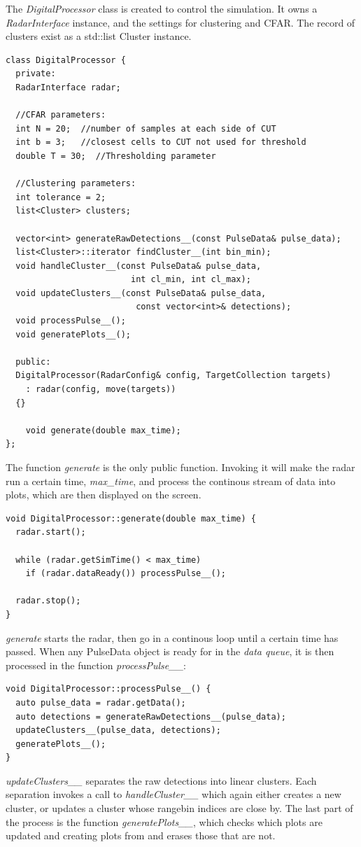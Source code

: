 \documentclass[letterpaper]{book}
\begin{document}
The \textit{DigitalProcessor} class is created to control the simulation. It owns a \textit{RadarInterface} instance, and the settings for clustering and CFAR. The record of clusters exist as a std::list Cluster instance. 
\begin{lstlisting}
class DigitalProcessor {
  private:
  RadarInterface radar;

  //CFAR parameters:
  int N = 20;  //number of samples at each side of CUT
  int b = 3;   //closest cells to CUT not used for threshold
  double T = 30;  //Thresholding parameter

  //Clustering parameters:
  int tolerance = 2;
  list<Cluster> clusters;

  vector<int> generateRawDetections__(const PulseData& pulse_data);
  list<Cluster>::iterator findCluster__(int bin_min);
  void handleCluster__(const PulseData& pulse_data, 
                         int cl_min, int cl_max);
  void updateClusters__(const PulseData& pulse_data, 
                          const vector<int>& detections);
  void processPulse__();
  void generatePlots__();

  public:
  DigitalProcessor(RadarConfig& config, TargetCollection targets)
    : radar(config, move(targets))
  {}

    void generate(double max_time);
};
\end{lstlisting}
The function \textit{generate} is the only public function. Invoking it will make the radar run a certain time, \textit{max\_time}, and process the continous stream of data into plots, which are then displayed on the screen. 
\begin{lstlisting}
void DigitalProcessor::generate(double max_time) {
  radar.start();

  while (radar.getSimTime() < max_time)
    if (radar.dataReady()) processPulse__();

  radar.stop();
}
\end{lstlisting}
\textit{generate} starts the radar, then go in a continous loop until a certain time has passed. When any PulseData object is ready for in the \textit{data queue}, it is then processed in the function \textit{processPulse\_\_}:
\begin{lstlisting}
void DigitalProcessor::processPulse__() {
  auto pulse_data = radar.getData();
  auto detections = generateRawDetections__(pulse_data);
  updateClusters__(pulse_data, detections);
  generatePlots__();
}
\end{lstlisting}


\textit{updateClusters\_\_} separates the raw detections into linear clusters. Each separation invokes a call to \textit{handleCluster\_\_} which again either creates a new cluster, or updates a cluster whose rangebin indices are close by.
The last part of the process is the function \textit{generatePlots\_\_}, which checks which plots are updated and creating plots from and erases those that are not.
\end{document}
